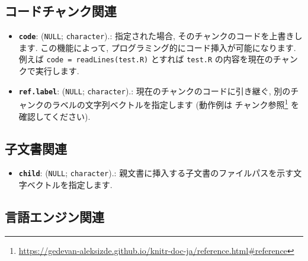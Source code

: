 \documentclass[
  11pt,
  lualatex,ja=standard,jafont=noto]{bxjsreport}
\providecommand{\tightlist}{%
  \setlength{\itemsep}{0pt}\setlength{\parskip}{0pt}}
\renewcommand{\href}[2]{#2\footnote{\url{#1}}}
\begin{document}
\hypertarget{code-chunk}{%
\subsection{コードチャンク関連}\label{code-chunk}}

\begin{itemize}
\tightlist
\item
  \textbf{\texttt{code}}: (\texttt{NULL}; \texttt{character}).: 指定された場合, そのチャンクのコードを上書きします. この機能によって, プログラミング的にコード挿入が可能になります. 例えば \texttt{code = readLines(\textquotesingle{}test.R\textquotesingle{})} とすれば \texttt{test.R} の内容を現在のチャンクで実行します.
\item
  \textbf{\texttt{ref.label}}: (\texttt{NULL}; \texttt{character}).: 現在のチャンクのコードに引き継ぐ, 別のチャンクのラベルの文字列ベクトルを指定します (動作例は \href{https://gedevan-aleksizde.github.io/knitr-doc-ja/reference.html\#reference}{チャンク参照} を確認してください).
\end{itemize}

\hypertarget{child-document-appendix}{%
\subsection{子文書関連}\label{child-document-appendix}}

\begin{itemize}
\tightlist
\item
  \textbf{\texttt{child}}: (\texttt{NULL}; \texttt{character}).: 親文書に挿入する子文書のファイルパスを示す文字ベクトルを指定します.
\end{itemize}

\hypertarget{engine}{%
\subsection{言語エンジン関連}\label{engine}}
\end{document}
